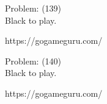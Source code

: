 \documentclass[11pt]{article}
\begin{document}
\begin{minipage}[t]{0.5\textwidth}
  {\centering
  
Problem: (139)\\
Black to play.

https://gogameguru.com/\\
  }
\end{minipage}
\begin{minipage}[t]{0.5\textwidth}
  {\centering
  
Problem: (140)\\
Black to play.

https://gogameguru.com/\\
  }
\end{minipage}
\end{document}
